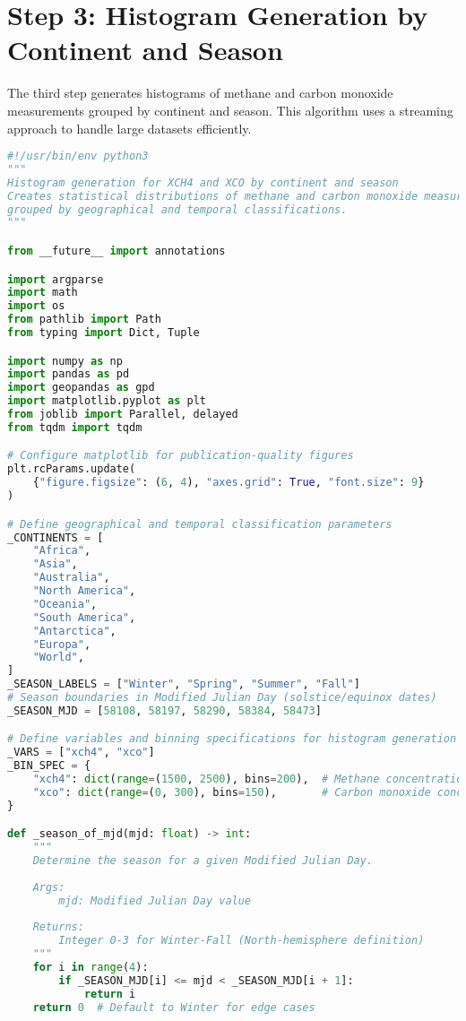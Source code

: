 \section{Step 3: Histogram Generation by Continent and Season}
\label{sec:appendixB_step3}

The third step generates histograms of methane and carbon monoxide measurements grouped by continent and season. This algorithm uses a streaming approach to handle large datasets efficiently.

\begin{lstlisting}[language=Python, caption=Histogram Generation Algorithm, label=alg:step03_histos]
#!/usr/bin/env python3
"""
Histogram generation for XCH4 and XCO by continent and season
Creates statistical distributions of methane and carbon monoxide measurements
grouped by geographical and temporal classifications.
"""

from __future__ import annotations

import argparse
import math
import os
from pathlib import Path
from typing import Dict, Tuple

import numpy as np
import pandas as pd
import geopandas as gpd
import matplotlib.pyplot as plt
from joblib import Parallel, delayed
from tqdm import tqdm

# Configure matplotlib for publication-quality figures
plt.rcParams.update(
    {"figure.figsize": (6, 4), "axes.grid": True, "font.size": 9}
)

# Define geographical and temporal classification parameters
_CONTINENTS = [
    "Africa",
    "Asia",
    "Australia",
    "North America",
    "Oceania",
    "South America",
    "Antarctica",
    "Europa",
    "World",
]
_SEASON_LABELS = ["Winter", "Spring", "Summer", "Fall"]
# Season boundaries in Modified Julian Day (solstice/equinox dates)
_SEASON_MJD = [58108, 58197, 58290, 58384, 58473]

# Define variables and binning specifications for histogram generation
_VARS = ["xch4", "xco"]
_BIN_SPEC = {
    "xch4": dict(range=(1500, 2500), bins=200),  # Methane concentration range
    "xco": dict(range=(0, 300), bins=150),       # Carbon monoxide concentration range
}

def _season_of_mjd(mjd: float) -> int:
    """
    Determine the season for a given Modified Julian Day.
    
    Args:
        mjd: Modified Julian Day value
        
    Returns:
        Integer 0-3 for Winter-Fall (North-hemisphere definition)
    """
    for i in range(4):
        if _SEASON_MJD[i] <= mjd < _SEASON_MJD[i + 1]:
            return i
    return 0  # Default to Winter for edge cases


\end{lstlisting}
